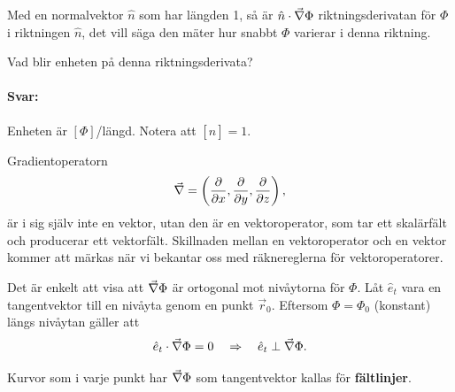 \documentclass[%
oneside,                 %
final,                   %
10pt]{article}
\newenvironment{notice_mdfboxadmon}[1][]{
\begin{notice_mdfboxmdframed}[frametitle=#1]
}
{
\end{notice_mdfboxmdframed}
}
\begin{document}
Med en normalvektor $\hat{n}$ som har längden 1, så är $\hat{n} \cdot \vec{\nabla} \Phi$ riktningsderivatan för $\Phi$ i riktningen $\hat{n}$, det vill säga den mäter hur snabbt $\Phi$ varierar i denna riktning. 


\begin{notice_mdfboxadmon}[Riktningsderivata]
Vad blir enheten på denna riktningsderivata?
\paragraph{Svar:}
Enheten är $[ \Phi ]$/längd. Notera att $[ \hat{n} ]=1$.
\end{notice_mdfboxadmon} %



Gradientoperatorn
\begin{equation}
  \vec{\nabla} = \left(\frac{\partial}{\partial x}, \frac{\partial}{\partial y},
\frac{\partial}{\partial z}\right),
\end{equation}
är i sig själv inte en vektor, utan den är en vektoroperator, som tar ett skalärfält och producerar ett vektorfält.  Skillnaden mellan en vektoroperator och en vektor kommer att märkas när vi bekantar oss med räknereglerna för vektoroperatorer.

Det är enkelt att visa att $\vec{\nabla} \Phi$ är ortogonal mot nivåytorna för $\Phi$.  Låt $\hat{e}_t$ vara en tangentvektor till en nivåyta genom en punkt $\vec{r}_0$. Eftersom $\Phi = \Phi_0$ (konstant) längs nivåytan gäller att 
\[
\hat{e}_t \cdot \vec{\nabla} \Phi = 0 \quad \Rightarrow \quad \hat{e}_t \perp \vec{\nabla} \Phi.
\]

Kurvor som i varje punkt har $\vec{\nabla} \Phi$ som tangentvektor kallas för \textbf{fältlinjer}.
\end{document}
